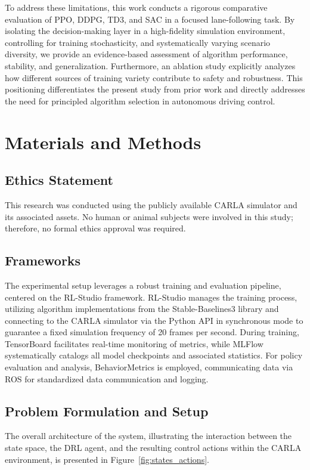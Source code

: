 \documentclass[]{interact}
\begin{document}
To address these limitations, this work conducts a rigorous comparative evaluation of PPO, DDPG, TD3, and SAC in a focused lane-following task. By isolating the decision-making layer in a high-fidelity simulation environment, controlling for training stochasticity, and systematically varying scenario diversity, we provide an evidence-based assessment of algorithm performance, stability, and generalization. Furthermore, an ablation study explicitly analyzes how different sources of training variety contribute to safety and robustness. This positioning differentiates the present study from prior work and directly addresses the need for principled algorithm selection in autonomous driving control.

\section{Materials and Methods}
\label{sec:materialsmethods}

\subsection{Ethics Statement}
This research was conducted using the publicly available CARLA simulator and its associated assets. No human or animal subjects were involved in this study; therefore, no formal ethics approval was required.

\subsection{Frameworks}

The experimental setup leverages a robust training and evaluation pipeline, centered on the RL-Studio framework. RL-Studio manages the training process, utilizing algorithm implementations from the Stable-Baselines3 library and connecting to the CARLA simulator via the Python API in synchronous mode to guarantee a fixed simulation frequency of 20 frames per second. 
During training, TensorBoard facilitates real-time monitoring of metrics, while MLFlow systematically catalogs all model checkpoints and associated statistics. For policy evaluation and analysis, BehaviorMetrics is employed, communicating data via ROS for standardized data communication and logging.

\subsection{Problem Formulation and Setup}
\label{sec:problem_formulation}
The overall architecture of the system, illustrating the interaction between the state space, the DRL agent, and the resulting control actions within the CARLA environment, is presented in Figure~\ref{fig:states_actions}.
\end{document}
